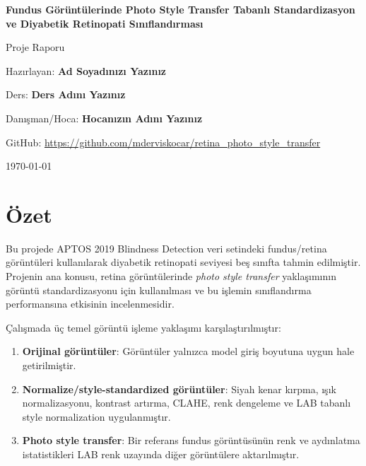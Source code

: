 \documentclass[12pt,a4paper]{article}
\begin{document}
\begin{titlepage}
    \centering
    \vspace*{2cm}
    {\Large \textbf{Fundus Görüntülerinde Photo Style Transfer Tabanlı Standardizasyon ve Diyabetik Retinopati Sınıflandırması}\par}
    \vspace{1.2cm}
    {\large Proje Raporu\par}
    \vspace{1.5cm}
    {\large Hazırlayan: \textbf{Ad Soyadınızı Yazınız}\par}
    \vspace{0.4cm}
    {\large Ders: \textbf{Ders Adını Yazınız}\par}
    \vspace{0.4cm}
    {\large Danışman/Hoca: \textbf{Hocanızın Adını Yazınız}\par}
    \vfill
    {\large GitHub: \url{https://github.com/mderviskocar/retina_photo_style_transfer}\par}
    \vspace{1cm}
    {\large \today\par}
\end{titlepage}

\tableofcontents
\newpage

\section{Özet}

Bu projede APTOS 2019 Blindness Detection veri setindeki fundus/retina görüntüleri kullanılarak diyabetik retinopati seviyesi beş sınıfta tahmin edilmiştir. Projenin ana konusu, retina görüntülerinde \textit{photo style transfer} yaklaşımının görüntü standardizasyonu için kullanılması ve bu işlemin sınıflandırma performansına etkisinin incelenmesidir.

Çalışmada üç temel görüntü işleme yaklaşımı karşılaştırılmıştır:

\begin{enumerate}
    \item \textbf{Orijinal görüntüler}: Görüntüler yalnızca model giriş boyutuna uygun hale getirilmiştir.
    \item \textbf{Normalize/style-standardized görüntüler}: Siyah kenar kırpma, ışık normalizasyonu, kontrast artırma, CLAHE, renk dengeleme ve LAB tabanlı style normalization uygulanmıştır.
    \item \textbf{Photo style transfer}: Bir referans fundus görüntüsünün renk ve aydınlatma istatistikleri LAB renk uzayında diğer görüntülere aktarılmıştır.
\end{enumerate}
\end{document}
